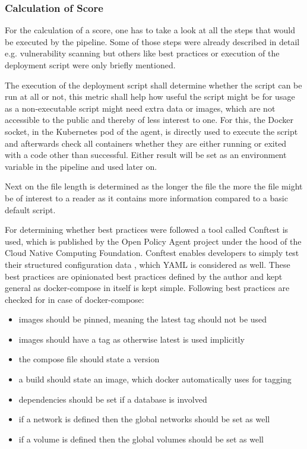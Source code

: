 \subsubsection{Calculation of Score}
For the calculation of a score, one has to take a look at all the steps that would be executed by the pipeline. Some of those steps were already described in detail e.g. vulnerability scanning but others like best practices or execution of the deployment script were only briefly mentioned.

The execution of the deployment script shall determine whether the script can be run at all or not, this metric shall help how useful the script might be for usage as a non-executable script might need extra data or images, which are not accessible to the public and thereby of less interest to one. For this, the Docker socket, in the Kubernetes pod of the agent, is directly used to execute the script and afterwards check all containers whether they are either running or exited with a code other than successful. Either result will be set as an environment variable in the pipeline and used later on.

Next on the file length is determined as the longer the file the more the file might be of interest to a reader as it contains more information compared to a basic default script.

For determining whether best practices were followed a tool called Conftest is used, which is published by the Open Policy Agent project under the hood of the Cloud Native Computing Foundation. Conftest enables developers to simply test their structured configuration data , which YAML is considered as well.
These best practices are opinionated best practices defined by the author and kept general as docker-compose in itself is kept simple. Following best practices are checked for in case of docker-compose: \\
\begin{itemize}
    \item images should be pinned, meaning the latest tag should not be used
    \item images should have a tag as otherwise latest is used implicitly
    \item the compose file should state a version
    \item a build should state an image, which docker automatically uses for tagging
    \item dependencies should be set if a database is involved
    \item if a network is defined then the global networks should be set as well
    \item if a volume is defined then the global volumes should be set as well
\end{itemize}

